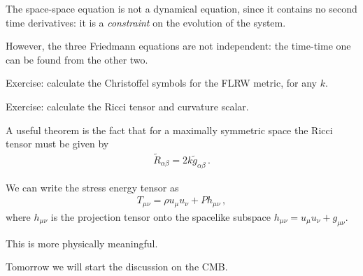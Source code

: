 \documentclass[main.tex]{subfiles}
\begin{document}
The space-space equation is not a dynamical equation, since it contains no second time derivatives: it is a \emph{constraint} on the evolution of the system. 

However, the three Friedmann equations are not independent: the time-time one can be found from the other two. 

\begin{greenbox}
Exercise: calculate the Christoffel symbols for the FLRW metric, for any \(k\). 
\end{greenbox}

\begin{greenbox}
Exercise: calculate the Ricci tensor and curvature scalar. 
\end{greenbox}

A useful theorem is the fact that for a maximally symmetric space the Ricci tensor must be given by
%
\begin{align}
\widetilde{R}_{\alpha \beta } = 2 k \widetilde{g}_{\alpha \beta }
\,. 
\end{align}

We can write the stress energy tensor as 
%
\begin{align}
T_{\mu \nu } = \rho u_{\mu } u_{\nu } + P h_{\mu \nu }
\,,
\end{align}
%
where \(h_{\mu \nu } \) is the projection tensor onto the spacelike subspace \(h_{\mu \nu } = u_{\mu} u_{\nu } + g_{\mu \nu }\). 

This is more physically meaningful. 

Tomorrow we will start the discussion on the CMB. 
\end{document}
